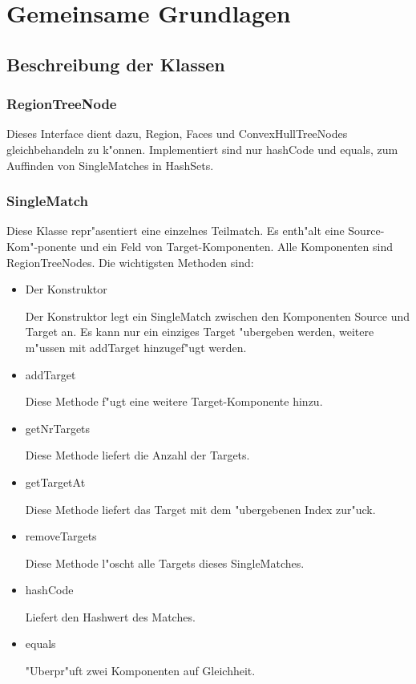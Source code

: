 \section{Gemeinsame Grundlagen }
\subsection{Beschreibung der Klassen}
\subsubsection{RegionTreeNode}

Dieses Interface dient dazu, Region, Faces und ConvexHullTreeNodes gleichbehandeln zu k"onnen. Implementiert sind nur hashCode und equals, zum Auffinden von SingleMatches in HashSets.

\subsubsection{SingleMatch}
Diese Klasse repr"asentiert eine einzelnes Teilmatch.  Es enth"alt eine Source-Kom"-ponente und ein Feld von Target-Komponenten. Alle Komponenten sind RegionTreeNodes.
Die wichtigsten Methoden sind:

\begin{itemize}
\item Der Konstruktor

Der Konstruktor legt ein SingleMatch zwischen den Komponenten Source und Target an. Es kann nur ein einziges Target "ubergeben werden, weitere m"ussen mit addTarget hinzugef"ugt werden.



\item addTarget

Diese Methode f"ugt eine weitere Target-Komponente hinzu.

\item getNrTargets

Diese Methode liefert die Anzahl der Targets.

\item getTargetAt

Diese Methode liefert das Target mit dem "ubergebenen Index zur"uck.

\item removeTargets

Diese Methode l"oscht alle Targets dieses SingleMatches.

\item hashCode

Liefert den Hashwert des Matches.

\item equals

"Uberpr"uft zwei Komponenten auf Gleichheit.

\end{itemize}

